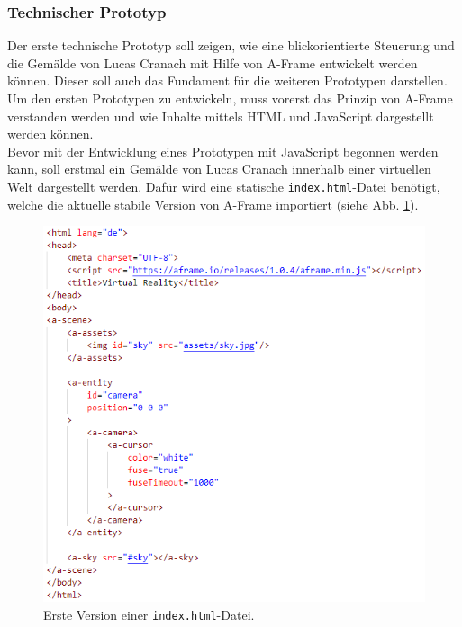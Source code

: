 \documentclass[a4paper,12pt,oneside]{article}
\begin{document}
      \subsubsection{Technischer Prototyp}
        Der erste technische Prototyp soll zeigen, wie eine blickorientierte
        Steuerung und die Gemälde von Lucas Cranach mit Hilfe von A-Frame 
        entwickelt werden können. Dieser soll auch das Fundament für die
        weiteren Prototypen darstellen. \\
        Um den ersten Prototypen zu entwickeln, muss vorerst das Prinzip
        von A-Frame verstanden werden und wie Inhalte mittels HTML
        und JavaScript dargestellt werden können. \\
        Bevor mit der Entwicklung eines Prototypen mit JavaScript begonnen
        werden kann, soll erstmal ein Gemälde von Lucas Cranach innerhalb
        einer virtuellen Welt dargestellt werden. Dafür wird eine statische
        \texttt{index.html}-Datei benötigt, welche die aktuelle stabile 
        Version von A-Frame importiert (siehe Abb. \ref{fig:index1}).
        \begin{figure}[h]
          \centering
          \includegraphics[scale=0.9]{img/coding/index1.png}
          \caption{Erste Version einer \texttt{index.html}-Datei.}
          \label{fig:index1}
        \end{figure}
\end{document}
